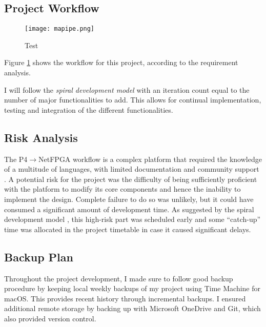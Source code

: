 \subsection{Project Workflow}
	\begin{figure}
		\centering
		\texttt{[image: mapipe.png]}
		\caption{Test}
		\label{workflow}
	\end{figure}

Figure \ref{workflow} shows the workflow for this project, according to the requirement analysis.

I will follow the \textit{spiral development model} \cite{spiral} with an iteration count equal to the number of major functionalities to add. This allows for continual implementation, testing and integration of the different functionalities.

\subsection{Risk Analysis}
The P4$\rightarrow$NetFPGA workflow is a complex platform that required the knowledge of a multitude of languages, with limited documentation \cite{fpga} and community support \cite{support}. A potential risk for the project was the difficulty of being sufficiently proficient with the platform to modify its core components and hence the inability to implement the design. Complete failure to do so was unlikely, but it could have consumed a significant amount of development time. As suggested by the spiral development model \cite{spiral}, this high-risk part was scheduled early and some “catch-up” time was allocated in the project timetable in case it caused significant delays.

\subsection{Backup Plan}	
Throughout the project development, I made sure to follow good backup procedure by keeping local weekly backups of my project using Time Machine for macOS. This provides recent history through incremental backups. I ensured additional remote storage by backing up with Microsoft OneDrive and Git, which also provided version control.